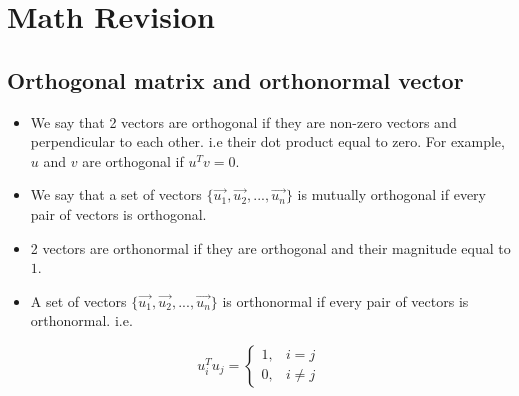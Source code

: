 \documentclass[a4paper, 12pt]{report}
\begin{document}
\section{Math Revision}
\subsection{Orthogonal matrix and orthonormal vector}
\begin{itemize}
    \item We say that 2 vectors are orthogonal if they are non-zero vectors and perpendicular to each other. i.e their dot product equal to zero.  For example, $u$ and $v$ are orthogonal if $u^Tv = 0$.
    \item We say that a set of vectors $\{\vec{u_1}, \vec{u_2},...,\vec{u_n}\}$ is mutually orthogonal if every pair of vectors is orthogonal.
    \item 2 vectors are orthonormal if they are orthogonal and their magnitude equal to $1$.
    \item A set of vectors $\{\vec{u_1}, \vec{u_2},...,\vec{u_n}\}$ is orthonormal if every pair of vectors is orthonormal. i.e.
\end{itemize}
    \begin{equation*}
      u_i^Tu_j = 
      \begin{cases}
        1, & i = j \\
        0, & i \neq j
      \end{cases}
    \end{equation*}
\end{document}
